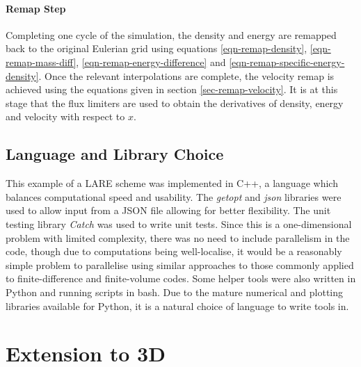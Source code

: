 \paragraph{Remap Step}
Completing one cycle of the simulation, the density and energy are remapped back to the original Eulerian grid using equations \eqref{eqn-remap-density}, \eqref{eqn-remap-mass-diff}, \eqref{eqn-remap-energy-difference} and \eqref{eqn-remap-specific-energy-density}. Once the relevant interpolations are complete, the velocity remap is achieved using the equations given in section \ref{sec-remap-velocity}. It is at this stage that the flux limiters are used to obtain the derivatives of density, energy and velocity with respect to $x$.

\subsection{Language and Library Choice}
This example of a LARE scheme was implemented in C++, a language which balances computational speed and usability. The \emph{getopt} and \emph{json} libraries were used to allow input from a JSON file allowing for better flexibility. The unit testing library \emph{Catch} was used to write unit tests. Since this is a one-dimensional problem with limited complexity, there was no need to include parallelism in the code, though due to computations being well-localise, it would be a reasonably simple problem to parallelise using similar approaches to those commonly applied to finite-difference and finite-volume codes. Some helper tools were also written in Python and running scripts in bash. Due to the mature numerical and plotting libraries available for Python, it is a natural choice of language to write tools in.

\section{Extension to 3D}
